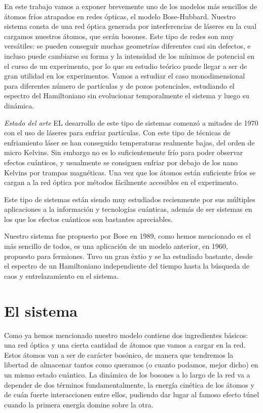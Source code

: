 \documentclass[11pt,a4paper]{article}
\begin{document}
En este  trabajo vamos a exponer brevemente uno de los modelos más sencillos de átomos fríos atrapados en redes ópticas, el modelo Bose-Hubbard. Nuestro sistema consta de una red óptica generada por interferencias de láseres en la cual cargamos nuestros átomos, que serán bosones. Este tipo de redes son muy versátiles: se pueden conseguir muchas geometrías diferentes casi sin defectos, e incluso puede cambiarse su forma y la intensidad de los mínimos de potencial en el curso de un experimento, por lo que su estudio teórico puede llegar a ser de gran utilidad en los experimentos. Vamos a estudiar el caso monodimensional para diferentes número de partículas y de pozos potenciales, estudiando el espectro del Hamiltoniano sin evolucionar temporalmente el sistema y luego su dinámica.


\textit{Estado del arte}
EL desarrollo de este tipo de sistemas comenzó a mitades de 1970 con el uso de láseres para enfriar partículas. Con este tipo de técnicas de enfriamiento láser se han conseguido temperaturas realmente bajas, del orden de micro Kelvins. Sin embargo no es lo suficientemente frío para poder observar efectos cuánticos, y usualmente se consiguen enfriar por debajo de los nano Kelvins por trampas magnéticas. Una vez que los átomos están suficiente fríos se cargan a la red óptica por métodos fácilmente accesibles en el experimento.

Este tipo de sistemas están siendo muy estudiados recienmente por sus múltiples aplicaciones a la información y tecnologías cuánticas, además de ser sistemas en los que los efectos cuánticos son bastantes apreciables.

Nuestro sistema fue propuesto por Bose en 1989, como hemos mencionado es el más sencillo de todos, es una aplicación de un modelo anterior, en 1960, propuesto para fermiones. Tuvo un gran éxtio y se ha estudiado bastante, desde el espectro de un Hamiltoniano independiente del tiempo hasta la búsqueda de caos y entrelazamiento en el sistema.


\section{El sistema}

Como ya hemos mencionado nuestro modelo contiene dos ingredientes básicos: una red óptica y una cierta cantidad de átomos que vamos a cargar en la red. Estos átomos van a ser de carácter bosónico, de manera que tendremos la libertad de almacenar tantos como queramos (o cuanto podamos, mejor dicho) en un mismo estado cuántico. La dinámica de los bosones a lo largo de la red va a depender de dos términos fundamentalmente, la energía cinética de los átomos y de cuán fuerte interaccionen entre ellos, pudiendo dar lugar al famoso efecto túnel cuando la primera energía domine sobre la otra.
\end{document}
